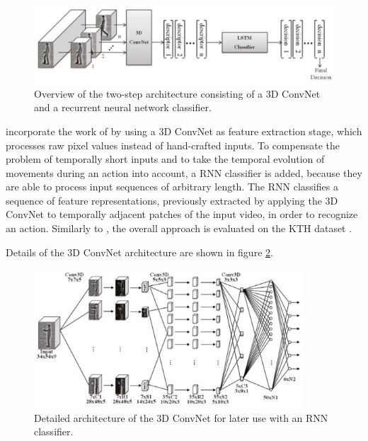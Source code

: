 \begin{figure}[H]
    \centering
    \includegraphics[width=\textwidth]{img_deep/sequentialdeep_overview.png}
    \caption{Overview of the two-step architecture consisting of a 3D ConvNet and a recurrent neural network classifier. \cite{baccouche_sequential_2011}}
    \label{fig:sequentialdeep_overview}
\end{figure}

\textcite{baccouche_sequential_2011} incorporate the work of \textcite{ji_3d_2013} by using a 3D ConvNet as feature extraction stage, which processes raw pixel values instead of hand-crafted inputs.
To compensate the problem of temporally short inputs and to take the temporal evolution of movements during an action into account, a RNN classifier is added, because they are able to process input sequences of arbitrary length.
The RNN classifies a sequence of feature representations, previously extracted by applying the 3D ConvNet to temporally adjacent patches of the input video, in order to recognize an action. 
Similarly to \cite{ji_3d_2013}, the overall approach is evaluated on the KTH dataset \cite{schuldt_recognizing_2004}.

Details of the 3D ConvNet architecture are shown in figure \ref{fig:sequentialdeep_cnnarchitecture}.
\begin{figure}[H]
    \centering
    \includegraphics[width=0.9\textwidth]{img_deep/sequentialdeep_cnnarchitecture}
    \caption{Detailed architecture of the 3D ConvNet for later use with an RNN classifier. \cite{baccouche_sequential_2011}}
    \label{fig:sequentialdeep_cnnarchitecture}
\end{figure}

